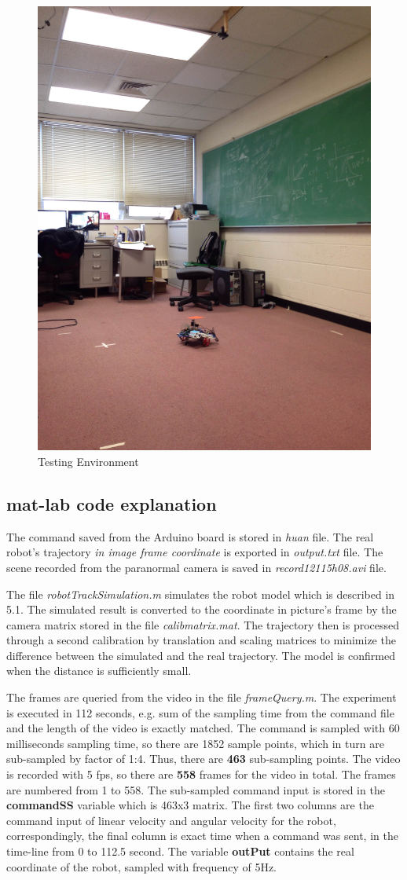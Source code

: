 \documentclass[times]{asjcauth}
\begin{document}
\begin{figure}
\centering
\includegraphics[width=.7\columnwidth]{testingEnvironment.jpg}
\caption{Testing Environment}
\end{figure}

\subsection{mat-lab code explanation}
The command saved from the Arduino board is stored in \emph{huan} file. The real robot's trajectory \emph{in image frame coordinate} is exported in \emph{output.txt} file. The scene recorded from the paranormal camera is saved in \emph{record12115h08.avi} file.

The file \emph{robotTrackSimulation.m} simulates the robot model which is described in 5.1. The simulated result is converted to the coordinate in picture's frame by the camera matrix stored in the file \emph{calibmatrix.mat}. The trajectory then is processed through a second calibration by translation and scaling matrices to minimize the difference between the simulated and the real trajectory. The model is confirmed when the distance is sufficiently small.

The frames are queried from the video in the file \emph{frameQuery.m}. The experiment is executed in 112 seconds, e.g. sum of the sampling time from the command file and the length of the video is exactly matched. The command is sampled with 60 milliseconds sampling time, so there are 1852 sample points, which in turn are sub-sampled by factor of 1:4. Thus, there are \textbf{463} sub-sampling points. The video is recorded with 5 fps, so there are \textbf{558} frames for the video in total. The frames are numbered from 1 to 558. The sub-sampled command input is stored in the \textbf{commandSS} variable which is 463x3 matrix. The first two columns are the command input of linear velocity and angular velocity for the robot, correspondingly, the final column is exact time when a command was sent, in the time-line from 0 to 112.5 second. The variable \textbf{outPut} contains the real coordinate of the robot, sampled with frequency of 5Hz.  
\end{document}
